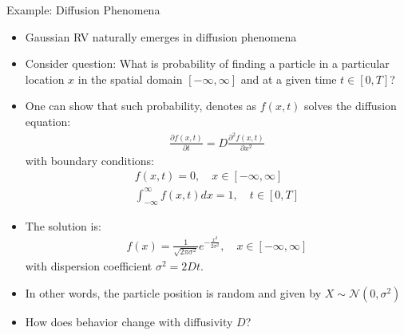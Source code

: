 \documentclass[9pt]{beamer}
\begin{document}
%
\begin{frame}{Example: Diffusion Phenomena}
\begin{itemize}
\setlength{\itemsep}{5pt}
\item Gaussian RV naturally emerges in diffusion phenomena
\item Consider question: What is probability of finding a particle in a particular location $x$ in the spatial domain $ [-\infty,\infty]$ and at a given time $t\in [0,T]$?
\item One can show that such probability, denotes as $f(x,t)$ solves the diffusion equation:
\begin{align*}
\frac{\partial f(x,t)}{\partial t}=D\frac{\partial^2 f(x,t)}{\partial x^2}
\end{align*}
with boundary conditions:
\begin{align*}
f(x,t)=0,\quad x\in [-\infty,\infty]\\
\int_{-\infty}^{\infty}f(x,t)dx=1,\quad t\in [0,T]
\end{align*}
\item The solution is:
\begin{align*}
f(x)=\frac{1}{\sqrt{2 \pi \sigma^2}}e^{-\frac{x^2}{2\sigma^2}},\quad  x\in [-\infty,\infty]
\end{align*}
with dispersion coefficient $\sigma^2=2Dt$.
\item In other words, the particle position is random and given by $X\sim\mathcal{N}(0,\sigma^2)$ 
\item How does behavior change with diffusivity $D$?
\end{itemize}

\end{frame}
\end{document}
